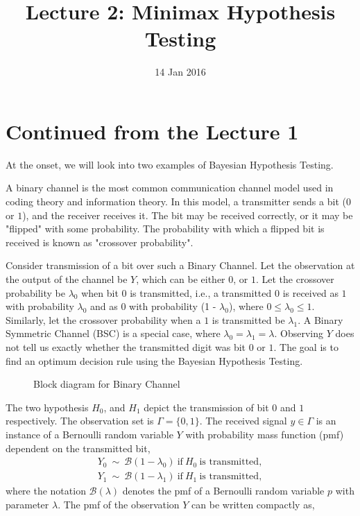 \documentclass[a4paper,english,12pt]{article}
\title{Lecture 2: Minimax Hypothesis Testing}
\date{14 Jan 2016}
\begin{document}
\maketitle
\section{Continued from the Lecture 1}
At the onset, we will look into two examples of Bayesian Hypothesis Testing.
\begin{exmp} 
A binary channel is the most common communication channel model used in coding theory and information theory. In this model, a transmitter sends a bit ($0$ or $1$), and the receiver receives it. The bit may be received correctly, or it may be "flipped" with some probability. The probability with which a flipped bit is received is known as "crossover probability". 
\par Consider transmission of a bit over such a Binary Channel. Let the observation at the output of the channel be $Y$, which can be either $0$, or $1$. Let the crossover probability be $\lambda_0$ when bit $0$ is transmitted, i.e., a transmitted $0$ is received as $1$ with probability $\lambda_0$ and as $0$ with probability (1 - $\lambda_0$), where $0 \leq \lambda_0 \leq 1$. Similarly, let the crossover probability when a $1$ is transmitted  be $\lambda_1$. A Binary Symmetric Channel (BSC) is a special case, where $\lambda_0=\lambda_1=\lambda$. Observing $Y$ does not tell us exactly whether the transmitted digit was bit $0$ or $1$. The goal is to find an optimum decision rule using the Bayesian Hypothesis Testing.
\begin{figure}[h]
\centering

\caption{Block diagram for Binary Channel}
\label{fig:bsc1}
\end{figure}
\par The two hypothesis $H_0$, and $H_1$ depict the transmission of bit $0$ and $1$ respectively. The observation set is $\Gamma=\{0,1\}$. The received signal $y \in \Gamma$ is an instance of a Bernoulli random variable $Y$ with probability mass function (pmf) dependent on the transmitted bit,
\begin{eqnarray}
Y_{0}~\sim~\mathcal{B}\left( 1-\lambda_{0}\right) ~\mbox{if}~H_0~\mbox{is transmitted},\\\nonumber
Y_{1}~\sim~\mathcal{B}\left( 1-\lambda_{1}\right)~\mbox{if}~H_1~\mbox{is transmitted},
\end{eqnarray}
where the notation $\mathcal{B}(\lambda)$ denotes the pmf of a Bernoulli random variable $p$ with parameter $\lambda$. The pmf of the observation $Y$ can be written compactly as,

\end{exmp}
\end{document}
